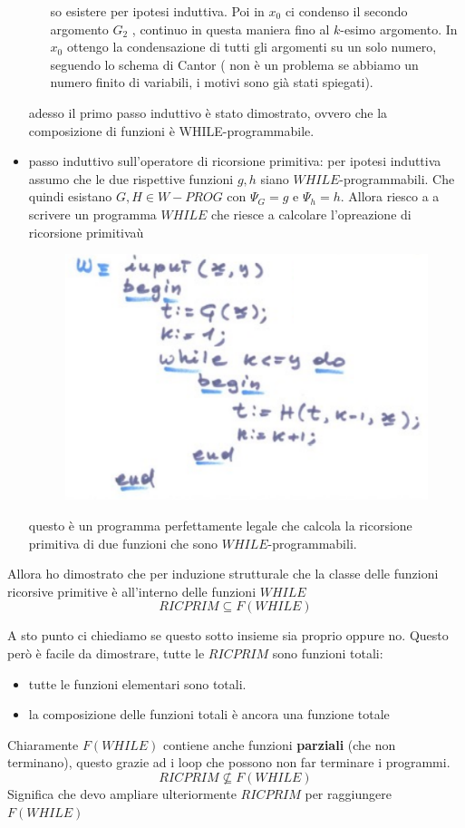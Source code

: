 \documentclass{article}
\begin{document}
\begin{itemize}
\begin{itemize}
                    so esistere per ipotesi induttiva. Poi in $x_0$ ci condenso il secondo argomento
                    $G_2$ , continuo in questa maniera fino al $k$-esimo argomento. In $x_0$ ottengo la
                    condensazione di tutti gli argomenti su un solo numero, seguendo lo schema di Cantor (
                    non è un problema se abbiamo un numero finito di variabili, i motivi sono già stati spiegati).
          \end{itemize}
          adesso il primo passo induttivo è stato dimostrato, ovvero che la composizione di funzioni
          è WHILE-programmabile.
    \item passo induttivo sull'operatore di ricorsione primitiva: per ipotesi induttiva
          assumo che le due rispettive funzioni $g,h$ siano $WHILE$-programmabili.
          Che quindi esistano $G,H\in W-PROG$ con $\Psi_G=g$ e $\Psi_h=h$.
          Allora riesco a
          a scrivere un programma $WHILE$ che riesce a calcolare l'opreazione di ricorsione primitivaù
          \begin{figure}[H]
              \centering
              \includegraphics[scale=0.5]{images/while-rico.png}
          \end{figure}
          questo è un programma perfettamente legale che calcola la ricorsione primitiva di due funzioni
          che sono $WHILE$-programmabili.
\end{itemize}
Allora ho dimostrato che per induzione strutturale che la classe delle funzioni ricorsive primitive
è all'interno delle funzioni $WHILE$
$$RICPRIM\subseteq F(WHILE)$$

A sto punto ci chiediamo se questo sotto insieme sia proprio oppure no. Questo però è facile
da dimostrare, tutte le $RICPRIM$ sono funzioni totali:
\begin{itemize}
    \item tutte le funzioni elementari sono totali.
    \item la composizione delle funzioni totali è ancora una funzione totale
\end{itemize}
Chiaramente $F(WHILE)$ contiene anche funzioni \textbf{parziali} (che non terminano),
questo grazie ad i loop che possono non far terminare i programmi.
$$RICPRIM\nsubseteq F(WHILE)$$
Significa che devo ampliare ulteriormente $RICPRIM$ per raggiungere $F(WHILE)$
\end{document}
